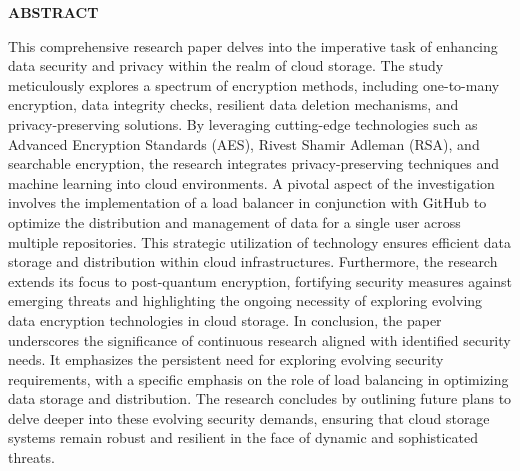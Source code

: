  \setcounter{page}{5}
\begin{center}
{\Large{\bf{ABSTRACT}}}
\end{center}
\vspace{1cm}
\noindent  This comprehensive research paper delves into the imperative task of enhancing data security and
privacy within the realm of cloud storage. The study meticulously explores a spectrum of
encryption methods, including one-to-many encryption, data integrity checks, resilient data deletion
mechanisms, and privacy-preserving solutions. By leveraging cutting-edge technologies such as
Advanced Encryption Standards (AES), Rivest Shamir Adleman (RSA), and searchable encryption,
the research integrates privacy-preserving techniques and machine learning into cloud
environments.
A pivotal aspect of the investigation involves the implementation of a load balancer in conjunction
with GitHub to optimize the distribution and management of data for a single user across multiple
repositories. This strategic utilization of technology ensures efficient data storage and distribution
within cloud infrastructures. Furthermore, the research extends its focus to post-quantum
encryption, fortifying security measures against emerging threats and highlighting the ongoing
necessity of exploring evolving data encryption technologies in cloud storage.
In conclusion, the paper underscores the significance of continuous research aligned with identified
security needs. It emphasizes the persistent need for exploring evolving security requirements, with
a specific emphasis on the role of load balancing in optimizing data storage and distribution. The
research concludes by outlining future plans to delve deeper into these evolving security demands,
ensuring that cloud storage systems remain robust and resilient in the face of dynamic and
sophisticated threats. 

\vspace{1.2cm}


\clearpage